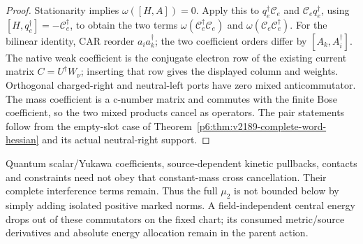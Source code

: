 \documentclass[12pt,a4paper]{article}
\begin{document}
\begin{proof}
Stationarity implies $\omega([H,A])=0$. Apply this to
$q_e^\dagger\mathcal C_e$ and $\mathcal C_eq_e^\dagger$, using
$[H,q_e^\dagger]=-\mathcal C_e^\dagger$, to obtain the two terms
$\omega(\mathcal C_e^\dagger\mathcal C_e)$ and
$\omega(\mathcal C_e\mathcal C_e^\dagger)$.
For the bilinear identity, CAR reorder $a_i a_k^\dagger$; the two
coefficient orders differ by $[A_k,A_i^\dagger]$.
The native weak coefficient is the conjugate electron row of the existing
current matrix $C=U^\dagger W_\nu$; inserting that row gives the displayed
column and weights. Orthogonal charged-right and neutral-left ports have
zero mixed anticommutator. The mass coefficient is a c-number matrix and
commutes with the finite Bose coefficient, so the two mixed products
cancel as operators. The pair statements follow from the empty-slot
case of Theorem~\ref{p6:thm:v2189-complete-word-hessian} and its actual
neutral-right support.
\end{proof}

Quantum scalar/Yukawa coefficients, source-dependent kinetic pullbacks,
contacts and constraints need not obey that constant-mass cross
cancellation. Their complete interference terms remain. Thus the full
$\mu_2$ is not bounded below by simply adding isolated positive marked
norms. A field-independent central energy drops out of these commutators
on the fixed chart; its consumed metric/source derivatives and absolute
energy allocation remain in the parent action.
\end{document}
